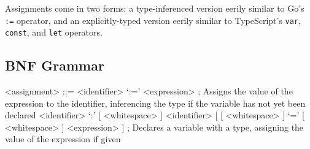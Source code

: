 \documentclass[letterpaper,titlepage]{scrreprt}
\begin{document}
Assignments come in two forms: a type-inferenced version eerily similar to Go's \lstinline{:=} operator, and an explicitly-typed version eerily similar to TypeScript's \lstinline{var}, \lstinline{const}, and \lstinline{let} operators.

\subsection{BNF Grammar}
\label{subsec:AssignmentBNF}

\begin{grammar}

<assignment> ::= <identifier> `:=' <expression> ; Assigns the value of the expression to the identifier, inferencing the type if the variable has not yet been declared
\alt <identifier> `:' [ <whitespace> ] <identifier> [ [ <whitespace> ] `=' [ <whitespace> ] <expression> ] ; Declares a variable with a type, assigning the value of the expression if given

\end{grammar}
\end{document}
